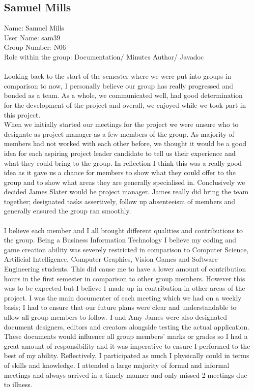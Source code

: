 \documentclass[titlepage]{article}
\begin{document}
{\subsection {Samuel Mills}
\normalsize{Name: Samuel Mills}
\\
\normalsize{User Name: sam39}
\\
\normalsize{Group Number: N06}
\\
\normalsize{Role within the group: Documentation/ Minutes Author/ Javadoc}
\\
\\
\normalsize {Looking back to the start of the semester where we were put into groups in comparison to now, I personally believe our group has really progressed and bonded as a team. As a whole, we communicated well, had good determination for the development of the project and overall, we enjoyed while we took part in this project.
\\ 
When we initially started our meetings for the project we were unsure who to designate as project manager as a few members of the group. As majority of members had not worked with each other before, we thought it would be a good idea for each aspiring project leader candidate to tell us their experience and what they could bring to the group. In reflection I think this was a really good idea as it gave us a chance for members to show what they could offer to the group and to show what areas they are generally specialised in. Conclusively we decided James Slater would be project manager. James really did bring the team together; designated tasks assertively, follow up absenteeism of members and generally ensured the group ran smoothly.
\\
\\
I believe each member and I all brought different qualities and contributions to the group. Being a Business Information Technology I believe my coding and game creation ability was severely restricted in comparison to Computer Science, Artificial Intelligence, Computer Graphics, Vision Games and Software Engineering students. This did cause me to have a lower amount of contribution hours in the first semester in comparison to other group members. However this was to be expected but I believe I made up in contribution in other areas of the project. I was the main documenter of each meeting which we had on a weekly basis; I had to ensure that our future plans were clear and understandable to allow all group members to follow. I and Amy James were also designated document designers, editors and creators alongside testing the actual application. These documents would influence all group members’ marks or grades so I had a great amount of responsibility and it was imperative to ensure I performed to the best of my ability. Reflectively, I participated as much I physically could in terms of skills and knowledge. I attended a large majority of formal and informal meetings and always arrived in a timely manner and only missed 2 meetings due to illness.
}}
\end{document}
